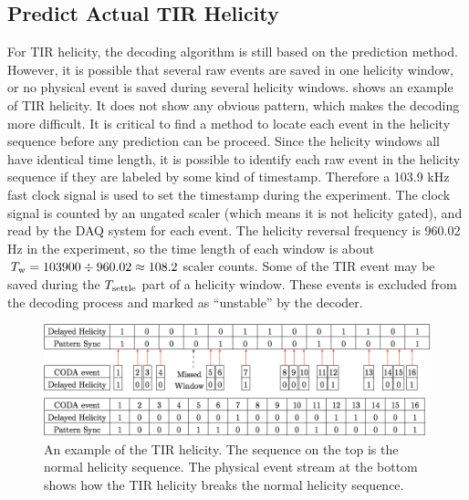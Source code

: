 \subsection{Predict Actual TIR Helicity}
\label{A2S2SS2}

For TIR helicity, the decoding algorithm is still based on the prediction method. However, it is possible that several raw events are saved in one helicity window, or no physical event is saved during several helicity windows.  shows an example of TIR helicity. It does not show any obvious pattern, which makes the decoding more difficult. It is critical to find a method to locate each event in the helicity sequence before any prediction can be proceed. Since the helicity windows all have identical time length, it is possible to identify each raw event in the helicity sequence if they are labeled by some kind of timestamp. Therefore a 103.9 kHz fast clock signal is used to set the timestamp during the experiment. The clock signal is counted by an ungated scaler (which means it is not helicity gated), and read by the DAQ system for each event. The helicity reversal frequency is 960.02 Hz in the experiment, so the time length of each window is about $\tw=103900\divisionsymbol960.02\approx108.2$ scaler counts. Some of the TIR event may be saved during the $T_{\mathrm{settle}}$ part of a helicity window. These events is excluded from the decoding process and marked as ``unstable'' by the decoder.

\begin{figure}[tb!]
  \centering
  \includegraphics[width=\textwidth]{figs/tir-helicity.png}
  \caption[An example of the TIR helicity.]{An example of the TIR helicity. The sequence on the top is the normal helicity sequence. The physical event stream at the bottom shows how the TIR helicity breaks the normal helicity sequence. \label{A2S2F3}}
\end{figure}

